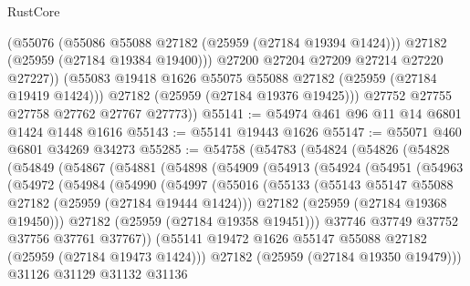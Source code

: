 \begin{lexlean}{RustCore}
\begin{coremodule}
              (@55076
                (@55086 @55088 @27182 (@25959 (@27184 @19394 @1424)))
                @27182
                (@25959 (@27184 @19384 @19400)))
              @27200
              @27204
              @27209
              @27214
              @27220
              @27227))
          (@55083 @19418 @1626 @55075 @55088 @27182 (@25959 (@27184 @19419 @1424)))
          @27182
          (@25959 (@27184 @19376 @19425)))
        @27752
        @27755
        @27758
        @27762
        @27767
        @27773))
@55141 := @54974 @461 @96 @11 @14 @6801 @1424 @1448 @1616
@55143 := @55141 @19443 @1626
@55147 := @55071 @460 @6801 @34269 @34273
@55285 := @54758
    (@54783
      (@54824
        (@54826
          (@54828
            (@54849
              (@54867
                (@54881
                  (@54898
                    (@54909
                      (@54913
                        (@54924
                          (@54951
                            (@54963
                              (@54972
                                (@54984
                                  (@54990
                                    (@54997
                                      (@55016
                                        (@55133
                                          (@55143
                                            @55147
                                            @55088
                                            @27182
                                            (@25959 (@27184 @19444 @1424)))
                                          @27182
                                          (@25959 (@27184 @19368 @19450)))
                                        @27182
                                        (@25959 (@27184 @19358 @19451)))
                                      @37746
                                      @37749
                                      @37752
                                      @37756
                                      @37761
                                      @37767))
                                  (@55141
                                    @19472
                                    @1626
                                    @55147
                                    @55088
                                    @27182
                                    (@25959 (@27184 @19473 @1424)))
                                  @27182
                                  (@25959 (@27184 @19350 @19479)))
                                @31126
                                @31129
                                @31132
                                @31136

\end{coremodule}
\end{lexlean}
